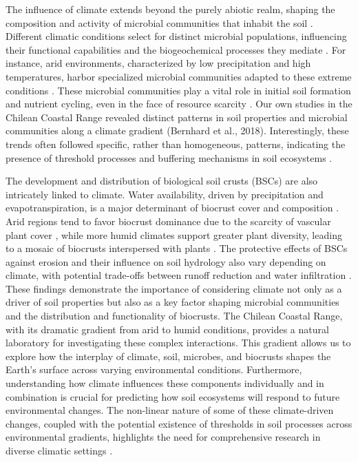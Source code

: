 The influence of climate extends beyond the purely abiotic realm, shaping the composition and activity of microbial communities that inhabit the soil \citep{Nemergut2005}. Different climatic conditions select for distinct microbial populations, influencing their functional capabilities and the biogeochemical processes they mediate \citep{Newsham2016}. For instance, arid environments, characterized by low precipitation and high temperatures, harbor specialized microbial communities adapted to these extreme conditions \citep{Pearce2012}. These microbial communities play a vital role in initial soil formation and nutrient cycling, even in the face of resource scarcity \cite{Bernhard2018}. Our own studies in the Chilean Coastal Range revealed distinct patterns in soil properties and microbial communities along a climate gradient (Bernhard et al., 2018). Interestingly, these trends often followed specific, rather than homogeneous, patterns, indicating the presence of threshold processes and buffering mechanisms in soil ecosystems \cite{Bernhard2018}.

The development and distribution of biological soil crusts (BSCs) are also intricately linked to climate. Water availability, driven by precipitation and evapotranspiration, is a major determinant of biocrust cover and composition \citep{Bowker2016}. Arid regions tend to favor biocrust dominance due to the scarcity of vascular plant cover \citep{Colesie2016,Grote2010}, while more humid climates support greater plant diversity, leading to a mosaic of biocrusts interspersed with plants \citep{Issa1999}. The protective effects of BSCs against erosion and their influence on soil hydrology also vary depending on climate, with potential trade-offs between runoff reduction and water infiltration \citep{Thielen2021}. These findings demonstrate the importance of considering climate not only as a driver of soil properties but also as a key factor shaping microbial communities and the distribution and functionality of biocrusts. The Chilean Coastal Range, with its dramatic gradient from arid to humid conditions, provides a natural laboratory for investigating these complex interactions. This gradient allows us to explore how the interplay of climate, soil, microbes, and biocrusts shapes the Earth’s surface across varying environmental conditions. Furthermore, understanding how climate influences these components individually and in combination is crucial for predicting how soil ecosystems will respond to future environmental changes. The non-linear nature of some of these climate-driven changes, coupled with the potential existence of thresholds in soil processes across environmental gradients, highlights the need for comprehensive research in diverse climatic settings \cite{Bernhard2018}.

